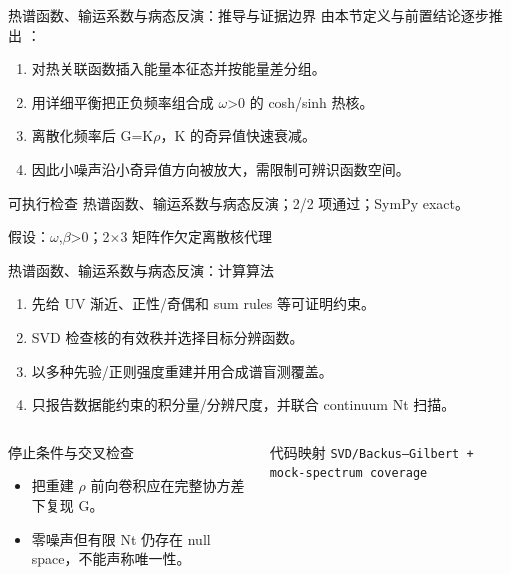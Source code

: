 \begin{frame}[t]{热谱函数、输运系数与病态反演：推导与证据边界}
\footnotesize
{}\quad 由本节定义与前置结论逐步推出 ：
\begin{enumerate}
\item 对热关联函数插入能量本征态并按能量差分组。
\item 用详细平衡把正负频率组合成 \ensuremath{\omega}>0 的 cosh/\allowbreak{}sinh 热核。
\item 离散化频率后 G=K\ensuremath{\rho}，K 的奇异值快速衰减。
\item 因此小噪声沿小奇异值方向被放大，需限制可辨识函数空间。
\end{enumerate}\begin{block}{可执行检查}
\quad 热谱函数、输运系数与病态反演；2/2 项通过；SymPy exact。
\par\scriptsize 假设：\ensuremath{\omega},\ensuremath{\beta}>0；2\ensuremath{\times}3 矩阵作欠定离散核代理
\end{block}
\end{frame}

\begin{frame}[t]{热谱函数、输运系数与病态反演：计算算法}
\footnotesize
{}\begin{enumerate}
\item 先给 UV 渐近、正性/\allowbreak{}奇偶和 sum rules 等可证明约束。
\item SVD 检查核的有效秩并选择目标分辨函数。
\item 以多种先验/\allowbreak{}正则强度重建并用合成谱盲测覆盖。
\item 只报告数据能约束的积分量/\allowbreak{}分辨尺度，并联合 continuum Nt 扫描。
\end{enumerate}\begin{columns}[T,onlytextwidth]
\begin{block}{停止条件与交叉检查}\scriptsize\begin{itemize}
\item[\CheckMark] 把重建 \ensuremath{\rho} 前向卷积应在完整协方差下复现 G。
\item[\CheckMark] 零噪声但有限 Nt 仍存在 null space，不能声称唯一性。
\end{itemize}\end{block}
\begin{block}{代码映射}
\scriptsize \texttt{SVD/\allowbreak{}Backus--Gilbert + mock-spectrum coverage}
\end{block}\end{columns}\end{frame}

